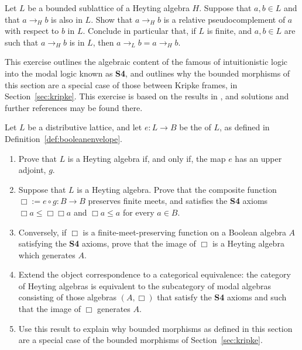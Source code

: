 \begin{exercise}\label{exe:heytingsub2}
Let $L$ be a bounded sublattice of a Heyting algebra $H$. Suppose that $a, b \in L$ and that $a \to_H b$ is also in $L$. Show that $a \to_H b$ is a relative pseudocomplement of $a$ with respect to $b$ in $L$. Conclude in particular that, if $L$ is finite, and $a, b \in L$ are such that $a \to_H b$ is in $L$, then $a \to_L b = a \to_H b$. 
\end{exercise}

\begin{exercise}\label{exe:heyting-S4}
  This exercise outlines the algebraic content of the famous  of intuitionistic logic into the modal logic known as {\bf S4}, and outlines why the bounded morphisms of this section are a special case of those between Kripke frames, in Section~\ref{sec:kripke}. This exercise is based on the results in \cite[Section 4]{GehEsak}, and solutions and further references may be found there. 
  
  Let $L$ be a distributive lattice, and let $e \colon L \to B$ be the  of $L$, as defined in Definition~\ref{def:booleanenvelope}.
  \begin{enumerate}
    \item Prove that $L$ is a Heyting algebra if, and only if, the map $e$ has an upper adjoint, $g$.
    \item Suppose that $L$ is a Heyting algebra. Prove that the composite function $\Box := e \circ g \colon B \to B$ preserves finite meets, and satisfies the {\bf S4} axioms $\Box a \leq \Box \Box a$ and $\Box a \leq a$ for every $a \in B$.
    \item Conversely, if $\Box$ is a finite-meet-preserving function on a Boolean algebra $A$ satisfying the {\bf S4} axioms, prove that the image of $\Box$ is a Heyting algebra which generates $A$.
    \item Extend the object correspondence to a categorical equivalence: the category of Heyting algebras is equivalent to the subcategory of modal algebras consisting of those algebras $(A, \Box)$ that satisfy the {\bf S4} axioms and such that the image of $\Box$ generates $A$.
    \item Use this result to explain why bounded morphisms as defined in this section are a special case of the bounded morphisms of Section~\ref{sec:kripke}.
  \end{enumerate}
\end{exercise}
\theendnotes
\setcounter{endnote}{0}



